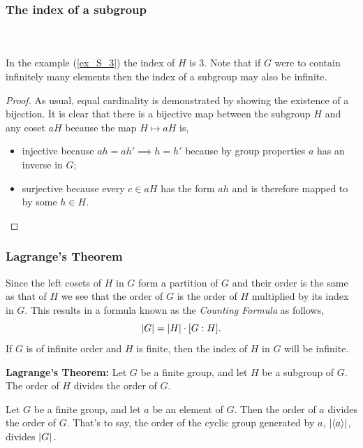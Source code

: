 \documentclass[MathsNotesBase.tex]{subfiles}
\begin{document}
{		\subsubsection{The index of a subgroup}
		\\\\
		In the example (\ref{ex_S_3}) the index of $H$ is 3. Note that if $G$ were to contain infinitely many elements then the index of a subgroup may also be infinite.\\
		
		\begin{proof}
			As usual, equal cardinality is demonstrated by showing the existence of a bijection. It is clear that there is a bijective map between the subgroup $H$ and any coset $aH$ because the map $H \longmapsto aH$ is,
			\begin{itemize}
				\item{injective because $ah = ah' \implies h = h'$ because by group properties $a$ has an inverse in $G$;}
				\item{surjective because every $c \in aH$ has the form $ah$ and is therefore mapped to by some $h \in H$.}
			\end{itemize}
		\end{proof}
	
		\subsubsection{Lagrange's Theorem}
		Since the left cosets of $H$ in $G$ form a partition of $G$ and their order is the same as that of $H$ we see that the order of $G$ is the order of $H$ multiplied by its index in $G$. This results in a formula known as the \textit{Counting Formula} as follows,
		\[ \left\lvert G\right\rvert = \left\lvert H\right\rvert \cdot [G:H]. \]
		If $G$ is of infinite order and $H$ is finite, then the index of $H$ in $G$ will be infinite.
		
		\begin{theorem}
			\textbf{Lagrange's Theorem: } Let $G$ be a finite group, and let $H$ be a subgroup of $G$. The order of $H$ divides the order of $G$.
		\end{theorem}
	
		\begin{corollary}
			Let $ G $ be a finite group, and let $ a $ be an element of $ G $. Then the order of $ a $ divides the order of $G$. That's to say, the order of the cyclic group generated by $a$, ${ \left\lvert\langle a \rangle\right\rvert }$, divides ${ \left\lvert G\right\rvert. }$
		\end{corollary}
	
}
\end{document}
